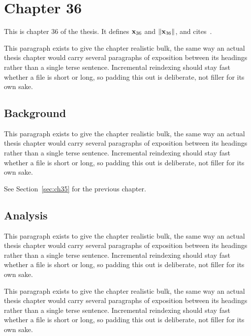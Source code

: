 \section{Chapter 36}
\label{sec:ch36}

This is chapter 36 of the thesis. It defines $\mathbf{x}_{36}$ and $\lVert \mathbf{x}_{36} \rVert$, and cites~\cite{ref1}.

This paragraph exists to give the chapter realistic bulk, the same way an actual thesis chapter would carry several paragraphs of exposition between its headings rather than a single terse sentence. Incremental reindexing should stay fast whether a file is short or long, so padding this out is deliberate, not filler for its own sake.

\subsection{Background}
\label{sec:ch36:background}

This paragraph exists to give the chapter realistic bulk, the same way an actual thesis chapter would carry several paragraphs of exposition between its headings rather than a single terse sentence. Incremental reindexing should stay fast whether a file is short or long, so padding this out is deliberate, not filler for its own sake.

See Section~\ref{sec:ch35} for the previous chapter.

\subsection{Analysis}
\label{sec:ch36:analysis}

This paragraph exists to give the chapter realistic bulk, the same way an actual thesis chapter would carry several paragraphs of exposition between its headings rather than a single terse sentence. Incremental reindexing should stay fast whether a file is short or long, so padding this out is deliberate, not filler for its own sake.

This paragraph exists to give the chapter realistic bulk, the same way an actual thesis chapter would carry several paragraphs of exposition between its headings rather than a single terse sentence. Incremental reindexing should stay fast whether a file is short or long, so padding this out is deliberate, not filler for its own sake.
